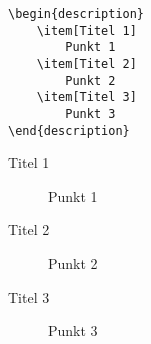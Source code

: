 \documentclass["WS\space 16-17\space -\space LaTeX-Kurs\space -\space Praesentation\space -\space 2.tex"]{subfiles}
\begin{document}
\begin{frame}[fragile]
	\Code
	\begin{lstlisting}
\begin{description}
	\item[Titel 1]
		Punkt 1
	\item[Titel 2]
		Punkt 2
	\item[Titel 3]
		Punkt 3
\end{description}
	\end{lstlisting}
	
	\Ausgabe
	\begin{outputbox}
		\begin{description}
			\item[Titel 1]
				Punkt 1
			\item[Titel 2]
				Punkt 2
			\item[Titel 3]
				Punkt 3
		\end{description}
	\end{outputbox}
\end{frame}
\end{document}
